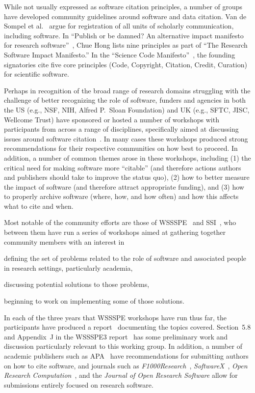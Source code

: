 \documentclass[12pt, oneside]{amsart}
\begin{document}
While not usually expressed as software citation principles, a number of groups
have developed community guidelines around software and data citation. Van de
Sompel et al.~\cite{VandeSompel2004} argue for registration of all units of
scholarly communication, including software. In ``Publish or be damned? An
alternative impact manifesto for research
software''~\cite{ssi-publish-or-be-damned}, Chue Hong lists nine principles as
part of ``The Research Software Impact Manifesto.'' In the
``Science Code Manifesto''~\cite{sciencecodemanifesto}, the founding signatories
cite five core principles (Code, Copyright, Citation, Credit, Curation) for
scientific software.

Perhaps in recognition of the broad range of research domains struggling with
the challenge of better recognizing the role of software, funders and agencies
in both the US (e.g., NSF, NIH, Alfred P.\ Sloan Foundation) and UK (e.g.,
SFTC, JISC, Wellcome Trust) have sponsored or hosted a number of workshops with
participants from across a range of
disciplines, specifically aimed at discussing issues around software
citation~\cite{Sufi:2014en,Ahalt:2015ve,ssisoftwarecredit,aas-software-index,saga,Allen:2015ub}.
In many cases these workshops produced strong recommendations for their
respective communities on how best to proceed. In addition, a number of common
themes arose in these workshops, including (1) the critical need for making
software more ``citable'' (and therefore actions authors and publishers
should take to improve the status quo), (2) how to better measure the impact
of software (and therefore attract appropriate funding), and (3) how to
properly archive software (where, how, and how often) and how this affects
what to cite and when.


Most notable of the community efforts are those of WSSSPE~\cite{wssspe} and
SSI~\cite{ssi-workshops}, who between them have run a series of workshops aimed
at gathering together community members with an interest in~
\begin{enumerate*}[series=InlineList]
    \item defining the set
of problems related to the role of software and associated people in research
settings, particularly academia,
    \item discussing potential solutions to those
problems,
\item beginning to work on implementing some of those solutions.
  \end{enumerate*}
In each of the three years that WSSSPE workshops have run thus far, the
participants have produced a report~\cite{WSSSPE1,WSSSPE2,WSSSPE3} documenting
the topics covered. Section~5.8 and Appendix~J in the WSSSPE3
report~\cite{WSSSPE3} has some preliminary work and discussion particularly
relevant to this working group.  In addition, a number of academic publishers
such as APA~\cite{APA-guidelines} have recommendations for submitting authors on
how to cite software, and journals such as \emph{F1000Research}~\cite{F1000},
\emph{SoftwareX}~\cite{softwareX}, \emph{Open Research Computation}~\cite{ORC}, and
the \emph{Journal of Open Research Software} allow for submissions entirely
focused on research software.
\end{document}
